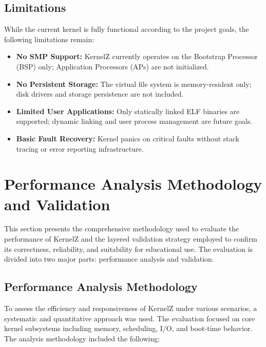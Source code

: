\documentclass[12pt]{extarticle}
\begin{document}
\subsection{Limitations}

While the current kernel is fully functional according to the project goals, the following limitations remain:

\begin{itemize}
    \item \textbf{No SMP Support:} KernelZ currently operates on the Bootstrap Processor (BSP) only; Application Processors (APs) are not initialized.
    \item \textbf{No Persistent Storage:} The virtual file system is memory-resident only; disk drivers and storage persistence are not included.
    \item \textbf{Limited User Applications:} Only statically linked ELF binaries are supported; dynamic linking and user process management are future goals.
    \item \textbf{Basic Fault Recovery:} Kernel panics on critical faults without stack tracing or error reporting infrastructure.
\end{itemize}

\pagebreak


\section{Performance Analysis Methodology and Validation}

This section presents the comprehensive methodology used to evaluate the performance of KernelZ and the layered validation strategy employed to confirm its correctness, reliability, and suitability for educational use. The evaluation is divided into two major parts: performance analysis and validation.

\subsection{Performance Analysis Methodology}

To assess the efficiency and responsiveness of KernelZ under various scenarios, a systematic and quantitative approach was used. The evaluation focused on core kernel subsystems including memory, scheduling, I/O, and boot-time behavior. The analysis methodology included the following:
\end{document}
